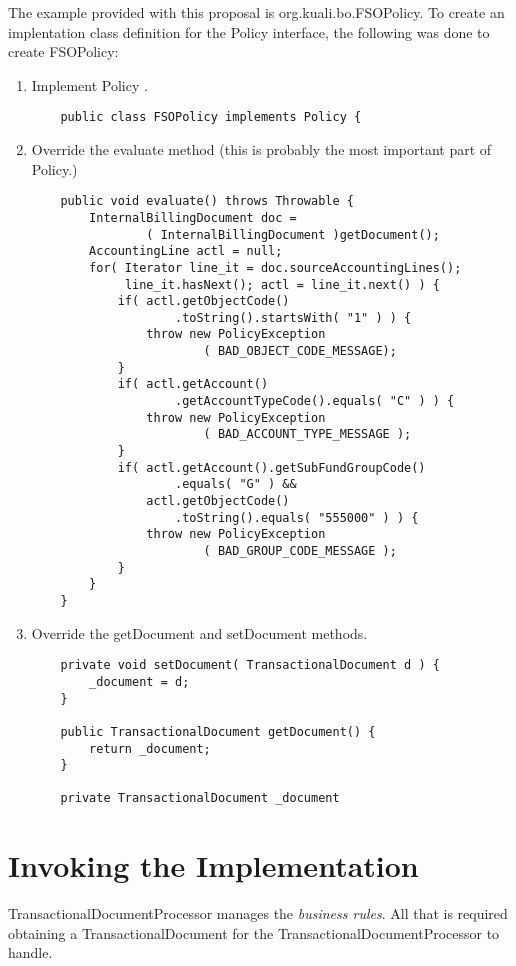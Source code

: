 \documentclass[12pt]{article}
\begin{document}
   The example provided with this proposal is \sf org.kuali.bo.FSOPolicy\rm.
To create an implentation class definition for the \sf Policy \rm interface,
the following was done to create \sf FSOPolicy\rm:
\begin{enumerate}
  \item Implement \sf Policy \rm.
  \sf \begin{verbatim}
    public class FSOPolicy implements Policy {
  \end{verbatim} \rm

  \item Override the \sf evaluate \rm method (this is probably the most
important part of \sf Policy\rm.)
  \sf \begin{verbatim}
    public void evaluate() throws Throwable {
        InternalBillingDocument doc =
                ( InternalBillingDocument )getDocument();
        AccountingLine actl = null;
        for( Iterator line_it = doc.sourceAccountingLines();
             line_it.hasNext(); actl = line_it.next() ) {
            if( actl.getObjectCode()
                    .toString().startsWith( "1" ) ) {
                throw new PolicyException
                        ( BAD_OBJECT_CODE_MESSAGE);
            }
            if( actl.getAccount()
                    .getAccountTypeCode().equals( "C" ) ) {
                throw new PolicyException
                        ( BAD_ACCOUNT_TYPE_MESSAGE );
            }
            if( actl.getAccount().getSubFundGroupCode()
                    .equals( "G" ) &&
                actl.getObjectCode()
                    .toString().equals( "555000" ) ) {
                throw new PolicyException
                        ( BAD_GROUP_CODE_MESSAGE );
            }
        }
    }
  \end{verbatim} \rm

  \item Override the \sf getDocument \rm and \sf setDocument \rm methods.
  \sf \begin{verbatim}
    private void setDocument( TransactionalDocument d ) { 
        _document = d; 
    }

    public TransactionalDocument getDocument() {  
        return _document; 
    }

    private TransactionalDocument _document
  \end{verbatim} \rm

\end{enumerate}

\section{Invoking the Implementation}
 \sf TransactionalDocumentProcessor \rm manages the \emph{business rules}. All
that is required obtaining a \sf TransactionalDocument \rm for the \sf
TransactionalDocumentProcessor to handle\rm.
\end{document}
